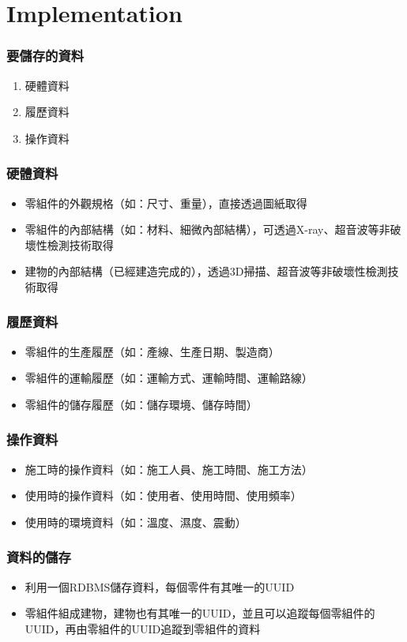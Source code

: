 \documentclass[xcolor=dvipsnames]{beamer}
\begin{document}
    \section{Implementation}
    \begin{frame}
        \frametitle{要儲存的資料}
        \begin{enumerate}
            \item 硬體資料
            \item 履歷資料
            \item 操作資料
        \end{enumerate}
    \end{frame}
    \begin{frame}
        \frametitle{硬體資料}
        \begin{itemize}
            \item 零組件的外觀規格（如：尺寸、重量），直接透過圖紙取得
            \item 零組件的內部結構（如：材料、細微內部結構），可透過X-ray、超音波等非破壞性檢測技術取得
            \item 建物的內部結構（已經建造完成的），透過3D掃描、超音波等非破壞性檢測技術取得
        \end{itemize}
    \end{frame}
    \begin{frame}
        \frametitle{履歷資料}
        \begin{itemize}
            \item 零組件的生產履歷（如：產線、生產日期、製造商）
            \item 零組件的運輸履歷（如：運輸方式、運輸時間、運輸路線）
            \item 零組件的儲存履歷（如：儲存環境、儲存時間）
        \end{itemize}
    \end{frame}
    \begin{frame}
        \frametitle{操作資料}
        \begin{itemize}
            \item 施工時的操作資料（如：施工人員、施工時間、施工方法）
            \item 使用時的操作資料（如：使用者、使用時間、使用頻率）
            \item 使用時的環境資料（如：溫度、濕度、震動）
        \end{itemize}
    \end{frame}
    \begin{frame}
        \frametitle{資料的儲存}
        \begin{itemize}
            \item 利用一個RDBMS儲存資料，每個零件有其唯一的UUID
            \item 零組件組成建物，建物也有其唯一的UUID，並且可以追蹤每個零組件的UUID，再由零組件的UUID追蹤到零組件的資料
        \end{itemize}
        
    \end{frame}
\end{document}
